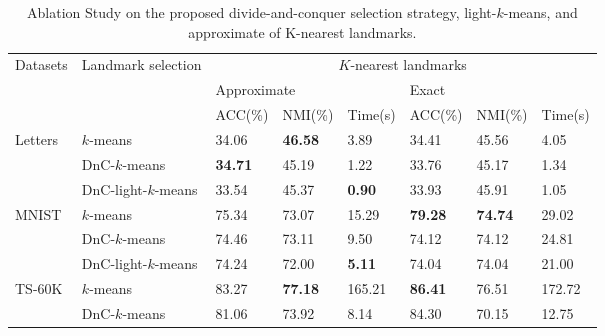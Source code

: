 \begin{table*}[]
  \centering
  \caption{Ablation Study on the proposed divide-and-conquer selection strategy, light-$k$-means, and approximate of K-nearest landmarks.}
  \label{tab:ablation}
  \begin{tabular}{@{}llllllll@{}}
    \toprule

    \multirow{3}{*}{Datasets} & \multirow{3}{*}{Landmark selection} & \multicolumn{6}{c}{$K$-nearest landmarks}                                  \\ \cmidrule(l){3-8}
    &                                     & \multicolumn{3}{l|}{Approximate}                 & \multicolumn{3}{l}{Exact}   \\ \cmidrule(l){3-8}
                                &                     & ACC(\%)        & NMI(\%)          & \multicolumn{1}{l|}{Time(s)}         & ACC(\%)          & NMI(\%)          & Time(s)   \\ \midrule
    \multirow{3}{*}{Letters}    & $k$-means           & {34.06}        & {\textbf{46.58}} & \multicolumn{1}{l|}{{3.89}}          & 34.41            & 45.56            & 4.05      \\
                                & DnC-$k$-means       & \textbf{34.71} & 45.19            & \multicolumn{1}{l|}{1.22}            & 33.76            & 45.17            & 1.34      \\
                                & DnC-light-$k$-means & {33.54}        & {45.37}          & \multicolumn{1}{l|}{{\textbf{0.90}}} & {33.93}          & {45.91}          & {1.05}    \\
    \midrule
    \multirow{3}{*}{MNIST}      & $k$-means           & {75.34}        & {73.07}          & \multicolumn{1}{l|}{{15.29}}         & \textbf{79.28}   & \textbf{74.74}   & 29.02     \\
                                & DnC-$k$-means       & 74.46          & 73.11            & \multicolumn{1}{l|}{9.50}            & 74.12            & 74.12            & 24.81     \\
                                & DnC-light-$k$-means & {74.24}        & {72.00}          & \multicolumn{1}{l|}{{\textbf{5.11}}} & {74.04}          & {74.04}          & {21.00}   \\
    \midrule
    \multirow{3}{*}{TS-60K}     & $k$-means           & {83.27}        & {\textbf{77.18}} & \multicolumn{1}{l|}{{165.21}}        & \textbf{86.41}   & 76.51            & 172.72    \\
                                & DnC-$k$-means       & 81.06          & 73.92            & \multicolumn{1}{l|}{8.14}            & 84.30            & 70.15            & 12.75     \\

\end{tabular}
\end{table*}
